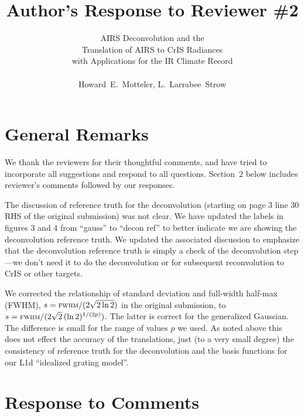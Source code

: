 \documentclass[11pt]{article}
\begin{document}
\title{Author's Response to Reviewer \#2 }

\author{AIRS Deconvolution and the \\
       Translation of AIRS to CrIS Radiances \\ 
       with Applications for the IR Climate Record \\
       \\
       Howard~E.~Motteler, L.~Larrabee~Strow}

\maketitle

\section{General Remarks}

We thank the reviewers for their thoughtful comments, and have 
tried to incorporate all suggestions and respond to all questions.
Section~2 below includes reviewer's comments followed by our
responses.

The discussion of reference truth for the deconvolution (starting on
page 3 line 30 RHS of the original submission) was not clear.  We
have updated the labels in figures 3 and 4 from ``gauss'' to ``decon
ref'' to better indicate we are showing the deconvolution reference
truth.  We updated the associated discussion to emphasize that the
deconvolution reference truth is simply a check of the deconvolution
step---we don't need it to do the deconvolution or for subsequent
reconvolution to CrIS or other targets.

We corrected the relationship of standard deviation and full-width
half-max (FWHM), $s=\mbox{\small\textsc{fwhm}} / (2\sqrt{2\ln 2})$ in the original
submission, to $s=\mbox{\small\textsc{fwhm}} / (2\sqrt{2}\,(\ln 2)^{1/(2p)})$.  The
latter is correct for the generalized Gaussian.  The difference is
small for the range of values $p$ we used.  As noted above this does
not effect the accuracy of the translations, just (to a very small
degree) the consistency of reference truth for the deconvolution and
the basis functions for our L1d ``idealized grating model''.

\section{Response to Comments}
\end{document}
